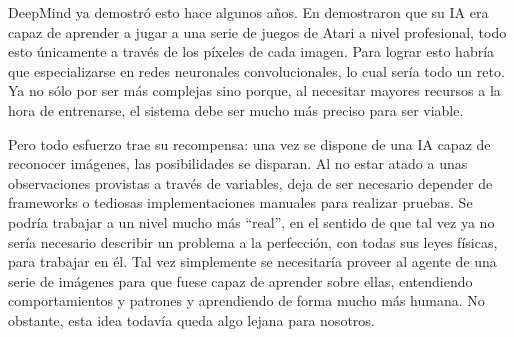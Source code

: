 DeepMind ya demostró esto hace algunos años. En \citet{mnih2013playing} demostraron que su IA era capaz de aprender a jugar a una serie de juegos de Atari a nivel profesional, todo esto únicamente a través de los píxeles de cada imagen. Para lograr esto habría que especializarse en redes neuronales convolucionales, lo cual sería todo un reto. Ya no sólo por ser más complejas sino porque, al necesitar mayores recursos a la hora de entrenarse, el sistema debe ser mucho más preciso para ser viable.

Pero todo esfuerzo trae su recompensa: una vez se dispone de una IA capaz de reconocer imágenes, las posibilidades se disparan. Al no estar atado a unas observaciones provistas a través de variables, deja de ser necesario depender de frameworks o tediosas implementaciones manuales para realizar pruebas. Se podría trabajar a un nivel mucho más ``real'', en el sentido de que tal vez ya no sería necesario describir un problema a la perfección, con todas sus leyes físicas, para trabajar en él. Tal vez simplemente se necesitaría proveer al agente de una serie de imágenes para que fuese capaz de aprender sobre ellas, entendiendo comportamientos y patrones y aprendiendo de forma mucho más humana. No obstante, esta idea todavía queda algo lejana para nosotros.
